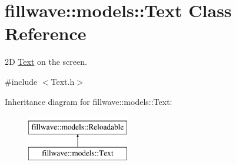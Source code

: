 \hypertarget{classfillwave_1_1models_1_1Text}{}\section{fillwave\+:\+:models\+:\+:Text Class Reference}
\label{classfillwave_1_1models_1_1Text}


2\+D \hyperlink{classfillwave_1_1models_1_1Text}{Text} on the screen.  




{\ttfamily \#include $<$Text.\+h$>$}

Inheritance diagram for fillwave\+:\+:models\+:\+:Text\+:\begin{figure}[H]
\begin{center}
\leavevmode
\includegraphics[height=2.000000cm]{classfillwave_1_1models_1_1Text}
\end{center}
\end{figure}
